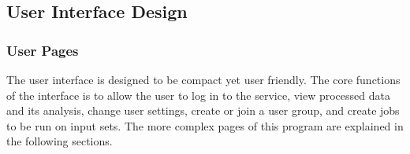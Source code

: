 \subsection{User Interface Design}
\subsubsection{User Pages}
The user interface is designed to be compact yet user friendly. The core functions of the interface is to allow the user to log in to the service, view processed data and its analysis, change user settings, create or join a user group, and create jobs to be run on input sets. The more complex pages of this program are explained in the following sections.








